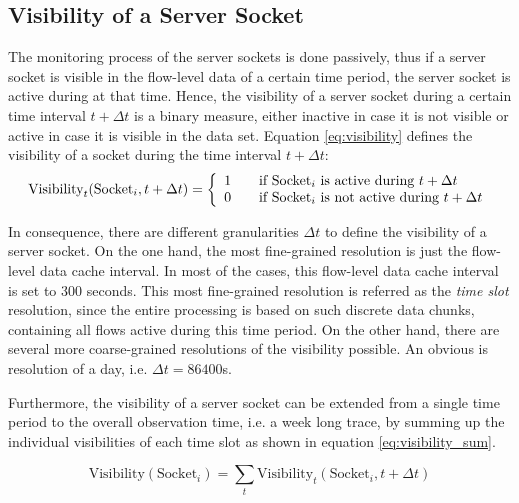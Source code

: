 \subsection{Visibility of a Server Socket\label{subsection:visibility}}

The monitoring process of the \glspl{server socket} is done passively, thus if a \gls{server socket} is visible in the flow-level data of a certain time period, the \gls{server socket} is active during at that time. Hence, the visibility of a \gls{server socket} during a certain time interval $t+\Delta{t}$ is a binary measure, either inactive in case it is not visible or active in case it is visible in the data set. Equation \ref{eq:visibility} defines the visibility of a socket during the time interval $t+\Delta{t}$:
\begin{equation}
	\text{Visibility}_t(\text{Socket}_i,t+\Delta{t}) = \left\{
	\begin{array}{l l}
		1 & \quad \text{if $\text{Socket}_i$ is active during $t+\Delta{t}$}\\
		0 & \quad \text{if $\text{Socket}_i$ is not active during $t+\Delta{t}$}\\
	\end{array}
	\right.
	\label{eq:visibility}
\end{equation}

In consequence, there are different granularities $\Delta{t}$ to define the visibility of a \gls{server socket}. On the one hand, the most fine-grained resolution is just the flow-level data cache interval. In most of the cases, this flow-level data cache interval is set to 300 seconds. This most fine-grained resolution is referred as the \emph{time slot} resolution, since the entire processing is based on such discrete data chunks, containing all flows active during this time period. 
On the other hand, there are several more coarse-grained resolutions of the visibility possible. An obvious is resolution of a day, i.e. $\Delta{t} = 86400$s.

Furthermore, the visibility of a \gls{server socket} can be extended from a single time period to the overall observation time, i.e. a week long trace, by summing up the individual visibilities of each time slot as shown in equation \ref{eq:visibility_sum}.

\begin{equation}
	\text{Visibility}(\text{Socket}_i) = \sum_{t} \text{Visibility}_t(\text{Socket}_i,t+\Delta{t})
	\label{eq:visibility_sum}
\end{equation}

